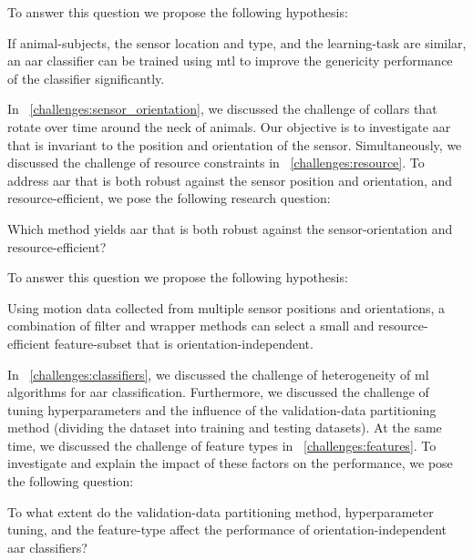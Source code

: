 To answer this question we propose the following hypothesis:

\begin{hypothesis}
\label{hyp:generic}
    If animal-subjects, the sensor location and type, and the learning-task are similar, an \gls{aar} classifier can be trained using \gls{mtl} to improve the genericity performance of the classifier significantly.
\end{hypothesis}


In \sectionname~\ref{challenges:sensor_orientation}, we discussed the challenge of collars that rotate over time around the neck of animals.
Our objective is to investigate \gls{aar} that is invariant to the position and orientation of the sensor.
Simultaneously, we discussed the challenge of resource constraints in \sectionname~\ref{challenges:resource}.
To address \gls{aar} that is both robust against the sensor position and orientation, and resource-efficient, we pose the following research question:

 \begin{ResearchQuestion}
\label{rq:orientation}
     Which method yields \gls{aar} that is both robust against the sensor-orientation and resource-efficient?
\end{ResearchQuestion}

To answer this question we propose the following hypothesis:

\begin{hypothesis}
\label{hyp:orientation}
    Using motion data collected from multiple sensor positions and orientations, a combination of filter and wrapper methods can select a small and resource-efficient feature-subset that is orientation-independent.
\end{hypothesis}

In \sectionname~\ref{challenges:classifiers}, we discussed the challenge of heterogeneity of \gls{ml} algorithms for \gls{aar} classification.
Furthermore, we discussed the challenge of tuning hyperparameters and the influence of the validation-data partitioning method (dividing the dataset into training and testing datasets).
At the same time, we discussed the challenge of feature types in \sectionname~\ref{challenges:features}.
To investigate and explain the impact of these factors on the performance, we pose the following question:

\begin{ResearchQuestion}
\label{rq:aar_analysis}
  To what extent do the validation-data partitioning method, hyperparameter tuning, and the feature-type affect the performance of orientation-independent \gls{aar} classifiers?
   
    
\end{ResearchQuestion}

